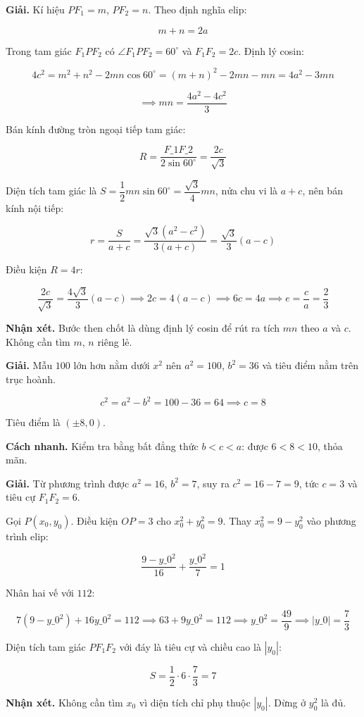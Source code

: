 \documentclass[11pt, a4paper]{article}
\begin{document}
\begin{dapan}[7 — Đáp án B]
\textbf{Giải.} Kí hiệu $PF_1 = m$, $PF_2 = n$. Theo định nghĩa elip:

$$m + n = 2a$$

Trong tam giác $F_1PF_2$ có $\angle F_1PF_2 = 60^\circ$ và $F_1F_2 = 2c$. Định lý cosin:

$$4c^2 = m^2 + n^2 - 2mn\cos 60^\circ = (m+n)^2 - 2mn - mn = 4a^2 - 3mn$$

$$\implies mn = \frac{4a^2 - 4c^2}{3}$$

Bán kính đường tròn ngoại tiếp tam giác:

$$R = \frac{F\_1F\_2}{2\sin 60^\circ} = \frac{2c}{\sqrt{3}}$$

Diện tích tam giác là $S = \dfrac{1}{2}mn\sin 60^\circ = \dfrac{\sqrt{3}}{4}mn$, nửa chu vi là $a + c$, nên bán kính nội tiếp:

$$r = \frac{S}{a+c} = \frac{\sqrt{3}(a^2 - c^2)}{3(a+c)} = \frac{\sqrt{3}}{3}(a - c)$$

Điều kiện $R = 4r$:

$$\frac{2c}{\sqrt{3}} = \frac{4\sqrt{3}}{3}(a - c) \implies 2c = 4(a - c) \implies 6c = 4a \implies e = \frac{c}{a} = \frac{2}{3}$$

\textbf{Nhận xét.} Bước then chốt là dùng định lý cosin để rút ra tích $mn$ theo $a$ và $c$. Không cần tìm $m$, $n$ riêng lẻ.
\end{dapan}

\begin{dapan}[8 — Đáp án A]
\textbf{Giải.} Mẫu $100$ lớn hơn nằm dưới $x^2$ nên $a^2 = 100$, $b^2 = 36$ và tiêu điểm nằm trên trục hoành.

$$c^2 = a^2 - b^2 = 100 - 36 = 64 \implies c = 8$$

Tiêu điểm là $(\pm 8, 0)$.

\textbf{Cách nhanh.} Kiểm tra bằng bất đẳng thức $b < c < a$: được $6 < 8 < 10$, thỏa mãn.
\end{dapan}

\begin{dapan}[9 — Đáp án C]
\textbf{Giải.} Từ phương trình được $a^2 = 16$, $b^2 = 7$, suy ra $c^2 = 16 - 7 = 9$, tức $c = 3$ và tiêu cự $F_1F_2 = 6$.

Gọi $P(x_0, y_0)$. Điều kiện $OP = 3$ cho $x_0^2 + y_0^2 = 9$. Thay $x_0^2 = 9 - y_0^2$ vào phương trình elip:

$$\frac{9 - y\_0^2}{16} + \frac{y\_0^2}{7} = 1$$

Nhân hai vế với $112$:

$$7(9 - y\_0^2) + 16y\_0^2 = 112 \implies 63 + 9y\_0^2 = 112 \implies y\_0^2 = \frac{49}{9} \implies |y\_0| = \frac{7}{3}$$

Diện tích tam giác $PF_1F_2$ với đáy là tiêu cự và chiều cao là $|y_0|$:

$$S = \frac{1}{2} \cdot 6 \cdot \frac{7}{3} = 7$$

\textbf{Nhận xét.} Không cần tìm $x_0$ vì diện tích chỉ phụ thuộc $|y_0|$. Dừng ở $y_0^2$ là đủ.
\end{dapan}
\end{document}
